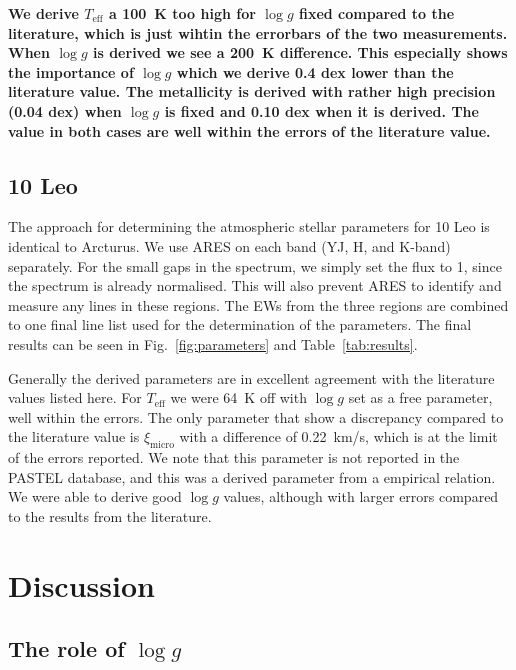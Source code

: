 \documentclass{aa}
\begin{document}
{\bf We derive $T_\mathrm{eff}$ a \SI{100}{K} too high for $\log g$ fixed compared to the
literature, which is just wihtin the errorbars of the two measurements. When $\log g$ is derived we
see a \SI{200}{K} difference. This especially shows the importance of $\log g$ which we derive 0.4
dex lower than the literature value. The metallicity is derived with rather high precision (0.04
dex) when $\log g$ is fixed and 0.10 dex when it is derived. The value in both cases are well within
the errors of the literature value.}


\subsection{10 Leo}
\label{sec:10Leo}

The approach for determining the atmospheric stellar parameters for 10 Leo is
identical to Arcturus. We use ARES on each band (YJ, H, and K-band) separately.
For the small gaps in the spectrum, we simply set the flux to 1, since the
spectrum is already normalised. This will also prevent ARES to identify and
measure any lines in these regions. The EWs from the three regions are combined
to one final line list used for the determination of the parameters. The
final results can be seen in Fig.~\ref{fig:parameters} and
Table~\ref{tab:results}.

Generally the derived parameters are in excellent agreement with the literature
values listed here.  For $T_\mathrm{eff}$ we were \SI{64}{K} off with $\log
g$ set as a free parameter, well within the errors. The only parameter that show
a discrepancy compared to the literature value is $\xi_\mathrm{micro}$ with a
difference of \SI{0.22}{km/s}, which is at the limit of the errors reported. We
note that this parameter is not reported in the PASTEL database, and this was a
derived parameter from a empirical relation. We were able to derive good $\log
g$ values, although with larger errors compared to the results from the
literature.



\section{Discussion}
\label{sec:discussion}

\subsection{The role of $\log g$}
\end{document}
